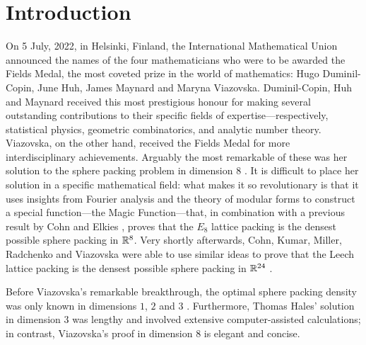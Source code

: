 \chapter{Introduction}
\thispagestyle{empty}

On 5 July, 2022, in Helsinki, Finland, the International Mathematical Union announced the names of the four mathematicians who were to be awarded the Fields Medal, the most coveted prize in the world of mathematics: Hugo Duminil-Copin, June Huh, James Maynard and Maryna Viazovska. Duminil-Copin, Huh and Maynard received this most prestigious honour for making several outstanding contributions to their specific fields of expertise---respectively, statistical physics, geometric combinatorics, and analytic number theory. Viazovska, on the other hand, received the Fields Medal for more interdisciplinary achievements. Arguably the most remarkable of these was her solution to the sphere packing problem in dimension 8 \cite{Viazovska8}. It is difficult to place her solution in a specific mathematical field: what makes it so revolutionary is that it uses insights from Fourier analysis and the theory of modular forms to construct a special function---the Magic Function---that, in combination with a previous result by Cohn and Elkies \cite{CohnElkies}, proves that the $E_8$ lattice packing is the densest possible sphere packing in $\mathbb{R}^8$. Very shortly afterwards, Cohn, Kumar, Miller, Radchenko and Viazovska were able to use similar ideas to prove that the Leech lattice packing is the densest possible sphere packing in $\mathbb{R}^{24}$ \cite{Viazovska24}.

Before Viazovska's remarkable breakthrough, the optimal sphere packing density was only known in dimensions $1$, $2$ and $3$ \cite{CohnOnViazovska}. Furthermore, Thomas Hales' solution in dimension $3$ \cite{HalesKeplerInformal} was lengthy and involved extensive computer-assisted calculations; in contrast, Viazovska's proof in dimension $8$ is elegant and concise. 






